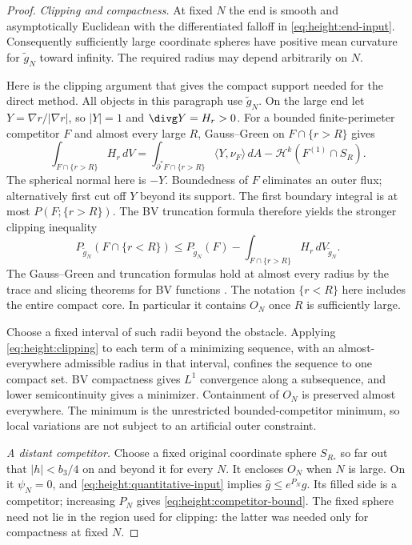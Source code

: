 \begin{proof}
\emph{Clipping and compactness.} At fixed $N$ the end is smooth and
asymptotically Euclidean with the
differentiated falloff in \eqref{eq:height:end-input}.
Consequently sufficiently large coordinate spheres have positive
mean curvature for $\widetilde g_N$ toward infinity.
The required radius may depend arbitrarily on $N$.

Here is the clipping argument that gives the compact support needed
for the direct method.  All objects in this paragraph use
$\widetilde g_N$.  On the large end let
$Y=\nabla r/|\nabla r|$, so $|Y|=1$ and
$\divg Y=H_r>0$.  For a bounded finite-perimeter competitor $F$ and
almost every large $R$, Gauss--Green on $F\cap\{r>R\}$ gives
\[
 \int_{F\cap\{r>R\}}H_r\,dV
 =\int_{\partial^*F\cap\{r>R\}}\langle Y,\nu_F\rangle\,dA
 -\mathcal H^k(F^{(1)}\cap S_R).
\]
The spherical normal here is $-Y$.  Boundedness of $F$ eliminates an
outer flux; alternatively first cut off $Y$ beyond its support.  The
first boundary integral is at most $P(F;\{r>R\})$.  The BV
truncation formula therefore yields the stronger clipping inequality
\begin{equation}\label{eq:height:clipping}
 P_{\widetilde g_N}(F\cap\{r<R\})
 \le P_{\widetilde g_N}(F)
 -\int_{F\cap\{r>R\}}H_r\,dV_{\widetilde g_N}.
\end{equation}
The Gauss--Green and truncation formulas hold at almost every radius
by the trace and slicing theorems for BV functions \cite{AFP}.
The notation $\{r<R\}$ here includes the entire compact
core.  In particular it contains $O_N$ once $R$ is sufficiently large.

Choose a fixed interval of such radii beyond the obstacle.  Applying
\eqref{eq:height:clipping} to each term of a minimizing
sequence, with an almost-everywhere admissible radius in that interval,
confines the sequence to one compact set.  BV compactness gives
$L^1$ convergence along a subsequence, and lower semicontinuity gives
a minimizer.  Containment of $O_N$ is preserved almost everywhere.
The minimum is the unrestricted bounded-competitor minimum, so local
variations are not subject to an artificial outer constraint.

\medskip\noindent\emph{A distant competitor.}
Choose a fixed original coordinate sphere $S_{R_*}$ so far out that
$|h|<b_3/4$ on and beyond it for every $N$.  It encloses $O_N$ when
$N$ is large.  On it $\psi_N=0$, and
\eqref{eq:height:quantitative-input} implies
$\widehat g\le e^{P_N}g$.  Its filled side is a competitor; increasing
$P_N$ gives \eqref{eq:height:competitor-bound}.  The fixed
sphere need not lie in the region used for clipping: the latter was
needed only for compactness at fixed $N$.


\end{proof}

